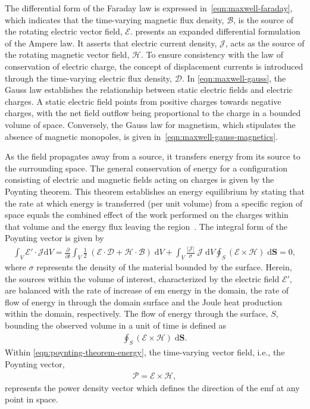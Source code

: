 The differential form of the Faraday law is expressed in~\cref{eqn:maxwell-faraday}, which indicates that the time-varying magnetic flux density, $\mathcal{B}$, is the source of the rotating electric vector field, $\mathcal{E}$.
 presents an expanded differential formulation of the Ampere law.
It asserts that electric current density, $\mathcal{J}$, acts as the source of the rotating magnetic vector field, $\mathcal{H}$.
To ensure consistency with the law of conservation of electric charge, the concept of displacement currents is introduced through the time-varying electric flux density, $\mathcal{D}$.
In \cref{eqn:maxwell-gauss}, the Gauss law establishes the relationship between static electric fields and electric charges. A static electric field points from positive charges towards negative charges, with the net field outflow being proportional to the charge in a bounded volume of space.
Conversely, the Gauss law for magnetism, which stipulates the absence of magnetic monopoles, is given in~\cref{eqn:maxwell-gauss-magnetics}.

As the field propagates away from a source, it transfers energy from its source to the surrounding space.
The general conservation of energy for a configuration consisting of electric and magnetic fields acting on charges is given by the Poynting theorem.
This theorem establishes an energy equilibrium by stating that the rate at which energy is transferred (per unit volume) from a specific region of space equals the combined effect of the work performed on the charges within that volume and the energy flux leaving the region~\cite{Jackson1998Classical}.
The integral form of the Poynting vector is given by
\begin{align}
    \label{eqn:poynting-theorem}
    \int_{V} \mathcal{E}' \cdot \mathcal{J} \mathrm{d}V = \frac{\partial}{\partial t}\int_V \frac{1}{2} \; \left( \mathcal{E} \cdot \mathcal{D} + \mathcal{H} \cdot \mathcal{B} \right) \; \mathrm{d}V + \int_{V} \frac{\left| \mathcal{J} \right|}{\sigma} \; \mathcal{J} \; \mathrm{d}V \oint_S \left( \mathcal{E} \times \mathcal{H} \right) \; \mathrm{d} \mathbf{S} = 0,
\end{align}
where $\sigma$ represents the density of the material bounded by the surface.
Herein, the sources within the volume of interest, characterized by the electric field $\mathcal{E}'$, are balanced with the rate of increase of \gls{em} energy in the domain, the rate of flow of energy in through the domain surface and the Joule heat production within the domain, respectively.
The flow of energy through the surface, $S$, bounding the observed volume in a unit of time is defined as
\begin{align}
    \label{eqn:poynting-theorem-energy}
    \oint_S \left( \mathcal{E} \times \mathcal{H} \right) \; \mathrm{d} \mathbf{S}.
\end{align}
Within \cref{eqn:poynting-theorem-energy}, the time-varying vector field, i.e., the Poynting vector,
\begin{align}
    \label{eqn:poynting-vector}
    \mathcal{P} = \mathcal{E} \times \mathcal{H},
\end{align}
represents the power density vector which defines the direction of the \gls{emf} at any point in space.

